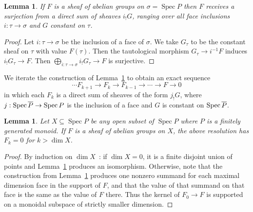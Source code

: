 \documentclass[10pt]{article}
\numberwithin{equation}{section}
\newtheorem{lemma}[paragraph]{Lemma}
\theoremstyle{definition}
\theoremstyle{remark}
\def\Spec{\operatorname{Spec}}
\def\spec{\Spec}
\renewcommand{\bar}[1]{\overnorm{#1}\vphantom{#1}}
\def\overnorm#1{\overline{#1}\vphantom{#1}}
\begin{document}
\begin{lemma} \label{lem:21}
	If $F$ is a sheaf of abelian groups on $\sigma = \spec P$ then $F$ receives a surjection from a direct sum of sheaves $i_! G$, ranging over all face inclusions $i : \tau \to \sigma$ and $G$ constant on $\tau$.
\end{lemma}
\begin{proof}
	Let $i : \tau \to \sigma$ be the inclusion of a face of $\sigma$.  We take $G_\tau$ to be the constant sheaf on $\tau$ with value $F(\tau)$.  Then the tautological morphism $G_\tau \to i^{-1} F$ induces $i_! G_\tau \to F$.  Then $\bigoplus_{i : \tau \to \sigma} i_! G_\tau \to F$ is surjective.
\end{proof}





We iterate the construction of Lemma~\ref{lem:21} to obtain an exact sequence
\[
	\cdots F_{k+1} \to F_k \to F_{k-1} \to \cdots \to F \to 0
\]
in which each $F_k$ is a direct sum of sheaves of the form $j_! G$, where $j : \spec \bar P \to \spec P$ is the inclusion of a face and $G$ is constant on $\spec \bar P$.  





\begin{lemma}\label{lem:finiteresolutionfgmonoid}
	Let $X \subseteq \spec P$ be any open subset of $\spec P$ where $P$ is a finitely generated monoid.  If $F$ is a sheaf of abelian groups on $X$, the above resolution has $F_k = 0$ for $k > \dim X$. 
\end{lemma}

\begin{proof}
	By induction on $\dim X$~: if $\dim X = 0$, it is a finite disjoint union of points and Lemma~\ref{lem:21} produces an isomorphism. Otherwise, note that the construction from Lemma~\ref{lem:21} produces one nonzero summand for each maximal dimension face in the support of $F$, and that the value of that summand on that face is the same as the value of $F$ there.  Thus the kernel of $F_0 \to F$ is supported on a monoidal subspace of strictly smaller dimension. 
\end{proof}
\end{document}
